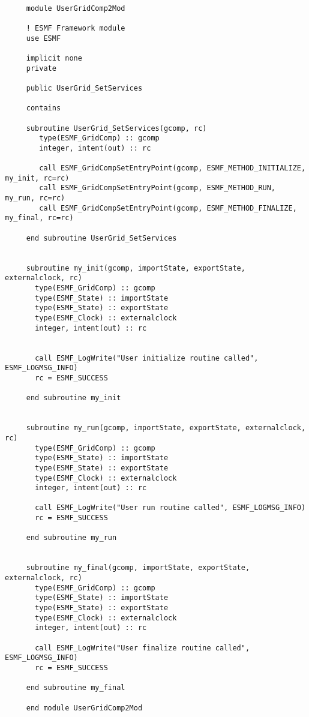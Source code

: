   
  \begin{verbatim}
 
     module UserGridComp2Mod
     
     ! ESMF Framework module
     use ESMF
     
     implicit none
     private
     
     public UserGrid_SetServices
 
     contains
 
     subroutine UserGrid_SetServices(gcomp, rc)
        type(ESMF_GridComp) :: gcomp
        integer, intent(out) :: rc
 
        call ESMF_GridCompSetEntryPoint(gcomp, ESMF_METHOD_INITIALIZE, my_init, rc=rc)
        call ESMF_GridCompSetEntryPoint(gcomp, ESMF_METHOD_RUN, my_run, rc=rc)
        call ESMF_GridCompSetEntryPoint(gcomp, ESMF_METHOD_FINALIZE, my_final, rc=rc)
 
     end subroutine UserGrid_SetServices
 
 
     subroutine my_init(gcomp, importState, exportState, externalclock, rc)
       type(ESMF_GridComp) :: gcomp
       type(ESMF_State) :: importState
       type(ESMF_State) :: exportState
       type(ESMF_Clock) :: externalclock
       integer, intent(out) :: rc
      
 
       call ESMF_LogWrite("User initialize routine called", ESMF_LOGMSG_INFO)
       rc = ESMF_SUCCESS
 
     end subroutine my_init
 
 
     subroutine my_run(gcomp, importState, exportState, externalclock, rc)
       type(ESMF_GridComp) :: gcomp
       type(ESMF_State) :: importState
       type(ESMF_State) :: exportState
       type(ESMF_Clock) :: externalclock
       integer, intent(out) :: rc
      
       call ESMF_LogWrite("User run routine called", ESMF_LOGMSG_INFO)
       rc = ESMF_SUCCESS
 
     end subroutine my_run
 
 
     subroutine my_final(gcomp, importState, exportState, externalclock, rc)
       type(ESMF_GridComp) :: gcomp
       type(ESMF_State) :: importState
       type(ESMF_State) :: exportState
       type(ESMF_Clock) :: externalclock
       integer, intent(out) :: rc
      
       call ESMF_LogWrite("User finalize routine called", ESMF_LOGMSG_INFO)
       rc = ESMF_SUCCESS
 
     end subroutine my_final
 
     end module UserGridComp2Mod
 
  \end{verbatim}
     
\setlength{\parskip}{\oldparskip}
\setlength{\parindent}{\oldparindent}
\setlength{\baselineskip}{\oldbaselineskip}
